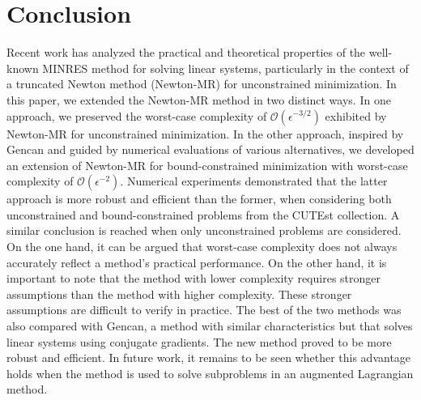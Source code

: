 \documentclass[11pt]{article}
\begin{document}
\section{Conclusion} \label{sec4}

Recent work has analyzed the practical and theoretical properties of the well-known MINRES method for solving linear systems, particularly in the context of a truncated Newton method (Newton-MR) for unconstrained minimization. In this paper, we extended the Newton-MR method in two distinct ways. In one approach, we preserved the worst-case complexity of $\mathcal{O}(\epsilon^{-3/2})$ exhibited by Newton-MR for unconstrained minimization. In the other approach, inspired by Gencan and guided by numerical evaluations of various alternatives, we developed an extension of Newton-MR for bound-constrained minimization with worst-case complexity of $\mathcal{O}(\epsilon^{-2})$. Numerical experiments demonstrated that the latter approach is more robust and efficient than the former, when considering both unconstrained and bound-constrained problems from the CUTEst collection. A similar conclusion is reached when only unconstrained problems are considered. On the one hand, it can be argued that worst-case complexity does not always accurately reflect a method's practical performance. On the other hand, it is important to note that the method with lower complexity requires stronger assumptions than the method with higher complexity. These stronger assumptions are difficult to verify in practice. The best of the two methods was also compared with Gencan, a method with similar characteristics but that solves linear systems using conjugate gradients. The new method proved to be more robust and efficient. In future work, it remains to be seen whether this advantage holds when the method is used to solve subproblems in an augmented Lagrangian method. 




\end{document}
